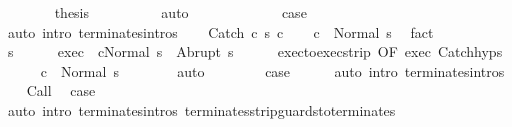 \begin{isabellebody}
\ \ \ \ \ \ \isamarkupfalse%
\ {\isacharquery}thesis\isanewline
\ \ \ \ \ \ \ \ \isamarkupfalse%
\ auto\isanewline
\ \ \ \ \isamarkupfalse%
\isanewline
\ \ \isacommand{{\isacharbraceright}}\isamarkupfalse%
\isanewline
\ \ \isamarkupfalse%
\ \isamarkupfalse%
\ {\isacharquery}case\isanewline
\ \ \ \ \isamarkupfalse%
\ {\isacharparenleft}auto\ intro{\isacharcolon}\ terminates{\isachardot}intros{\isacharparenright}\isanewline
{}\isamarkupfalse%
\isanewline
\ \ \isamarkupfalse%
\ {\isacharparenleft}Catch\ c{}\ s\ c{}{\isacharparenright}\isanewline
\ \ \isamarkupfalse%
\ {\isachardoublequoteopen}{\isasymGamma}{\isasymturnstile}c{}\ {\isasymdown}\ Normal\ s{\isachardoublequoteclose}\ \isamarkupfalse%
\ fact\isanewline
\ \ \isamarkupfalse%
\isanewline
\ \ \isacommand{{\isacharbraceleft}}\isamarkupfalse%
\isanewline
\ \ \ \ \isamarkupfalse%
\ s{\isacharprime}\isanewline
\ \ \ \ \isamarkupfalse%
\ exec{\isacharcolon}\ {\isachardoublequoteopen}{\isasymGamma}{\isasymturnstile}\ {\isasymlangle}c{}{\isacharcomma}Normal\ s{\isasymrangle}\ {\isasymRightarrow}\ Abrupt\ s{\isacharprime}{\isachardoublequoteclose}\isanewline
\ \ \ \ \isamarkupfalse%
\ exec{\isacharunderscore}to{\isacharunderscore}exec{\isacharunderscore}strip\ {\isacharbrackleft}OF\ exec{\isacharbrackright}\ Catch{\isachardot}hyps\isanewline
\ \ \ \ \isamarkupfalse%
\ {\isachardoublequoteopen}{\isasymGamma}{\isasymturnstile}c{}\ {\isasymdown}\ Normal\ s{\isacharprime}{\isachardoublequoteclose}\isanewline
\ \ \ \ \ \ \isamarkupfalse%
\ auto\isanewline
\ \ \isacommand{{\isacharbraceright}}\isamarkupfalse%
\isanewline
\ \ \isamarkupfalse%
\ \isamarkupfalse%
\ {\isacharquery}case\isanewline
\ \ \ \ \isamarkupfalse%
\ {\isacharparenleft}auto\ intro{\isacharcolon}\ terminates{\isachardot}intros{\isacharparenright}\isanewline
{}\isamarkupfalse%
\isanewline
\ \ \isamarkupfalse%
\ Call\ \isamarkupfalse%
\ {\isacharquery}case\ \isanewline
\ \ \ \ \isamarkupfalse%
\ {\isacharparenleft}auto\ intro{\isacharcolon}\ terminates{\isachardot}intros\ terminates{\isacharunderscore}strip{\isacharunderscore}guards{\isacharunderscore}to{\isacharunderscore}terminates{\isacharparenright}\isanewline

\end{isabellebody}

